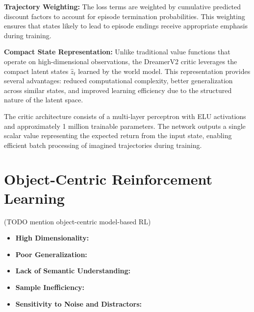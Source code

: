 \documentclass[
	english,
	ruledheaders=section,
	class=report,
	thesis={type=master},
	accentcolor=9c,
	custommargins=true,
	marginpar=false,
	parskip=half-,
	fontsize=11pt,
]{tudapub}
\begin{document}
\textbf{Trajectory Weighting:} The loss terms are weighted by cumulative predicted discount factors to account for episode termination probabilities. This weighting ensures that states likely to lead to episode endings receive appropriate emphasis during training.

\textbf{Compact State Representation:} Unlike traditional value functions that operate on high-dimensional observations, the DreamerV2 critic leverages the compact latent states $\hat{z}_t$ learned by the world model. This representation provides several advantages: reduced computational complexity, better generalization across similar states, and improved learning efficiency due to the structured nature of the latent space.

The critic architecture consists of a multi-layer perceptron with ELU activations and approximately 1 million trainable parameters. The network outputs a single scalar value representing the expected return from the input state, enabling efficient batch processing of imagined trajectories during training.





\section{Object-Centric Reinforcement Learning}
\label{sec:object_centric_rl}
(TODO mention object-centric model-based RL)

\begin{itemize}
	\item \textbf{High Dimensionality:} 
	\item \textbf{Poor Generalization:} 
	\item \textbf{Lack of Semantic Understanding:} 
	\item \textbf{Sample Inefficiency:} 
	\item \textbf{Sensitivity to Noise and Distractors:} 
\end{itemize}
\end{document}
